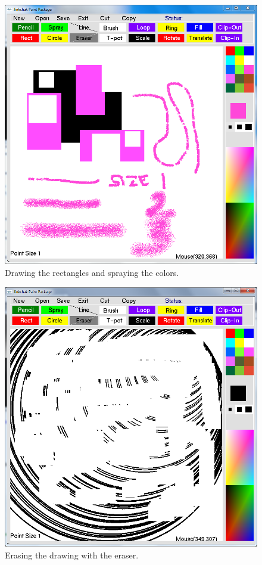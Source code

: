\documentclass[12pt]{report}
\begin{document}
\begin{figure}[h!]
  
  \centering
    \includegraphics[scale=0.45]{screenshots/rectangle_spray.png}
\caption{Drawing the rectangles and spraying the colors.}
\end{figure}
\begin{figure}[h!]
  
  \centering
    \includegraphics[scale=0.45]{screenshots/eraser.png}
\caption{Erasing the drawing with the eraser.}
\end{figure}
\end{document}
